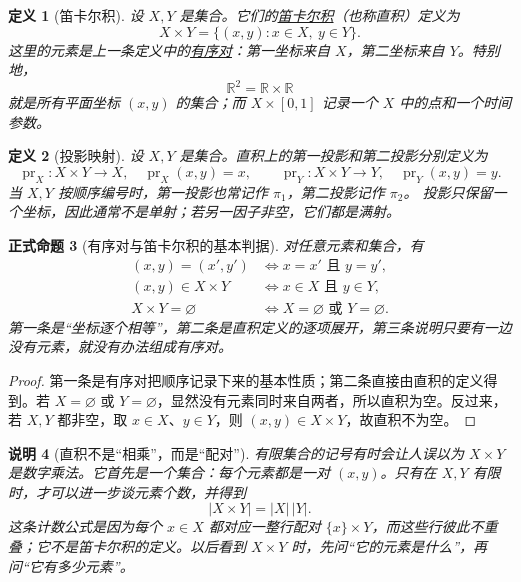 \documentclass[UTF8,fontset=none,a4paper,11pt]{ctexart}
\theoremstyle{foundation-definition}
\newtheorem{definition}{定义}[section]
\theoremstyle{foundation-theorem}
\theoremstyle{foundation-proposition}
\newtheorem{proposition}[definition]{正式命题}
\theoremstyle{foundation-example}
\theoremstyle{foundation-remark}
\newtheorem{remark}[definition]{说明}
\theoremstyle{foundation-theorem}
\newcommand{\term}[2]{\hyperref[#1]{#2}}
\begin{document}
\begin{definition}[笛卡尔积]\label{def:cartesian-product}
设 \(X,Y\) 是集合。它们的\term{def:cartesian-product}{笛卡尔积}（也称直积）定义为
\[
X\times Y=\{(x,y):x\in X,\ y\in Y\}.
\]
这里的元素是上一条定义中的\term{def:ordered-pair}{有序对}：第一坐标来自 \(X\)，第二坐标来自
\(Y\)。特别地，
\[
\mathbb R^2=\mathbb R\times\mathbb R
\]
就是所有平面坐标 \((x,y)\) 的集合；而 \(X\times[0,1]\) 记录一个
\(X\) 中的点和一个时间参数。
\end{definition}

\begin{definition}[投影映射]\label{def:projection-map}
设 \(X,Y\) 是集合。直积上的第一投影和第二投影分别定义为
\[
\operatorname{pr}_X:X\times Y\to X,\quad \operatorname{pr}_X(x,y)=x,
\qquad
\operatorname{pr}_Y:X\times Y\to Y,\quad \operatorname{pr}_Y(x,y)=y.
\]
当 \(X,Y\) 按顺序编号时，第一投影也常记作 \(\pi_1\)，第二投影记作 \(\pi_2\)。
投影只保留一个坐标，因此通常不是单射；若另一因子非空，它们都是满射。
\end{definition}

\begin{proposition}[有序对与笛卡尔积的基本判据]
对任意元素和集合，有
\[
\begin{aligned}
 (x,y)=(x',y')&\Longleftrightarrow x=x'\text{ 且 }y=y',\\
 (x,y)\in X\times Y&\Longleftrightarrow x\in X\text{ 且 }y\in Y,\\
 X\times Y=\varnothing&\Longleftrightarrow X=\varnothing\text{ 或 }Y=\varnothing.
\end{aligned}
\]
第一条是“坐标逐个相等”，第二条是直积定义的逐项展开，第三条说明只要有一边没有元素，就没有办法组成有序对。
\end{proposition}

\begin{proof}
第一条是有序对把顺序记录下来的基本性质；第二条直接由直积的定义得到。若 \(X=\varnothing\) 或 \(Y=\varnothing\)，显然没有元素同时来自两者，所以直积为空。反过来，若 \(X,Y\) 都非空，取 \(x\in X\)、\(y\in Y\)，则 \((x,y)\in X\times Y\)，故直积不为空。
\end{proof}

\begin{remark}[直积不是“相乘”，而是“配对”]
有限集合的记号有时会让人误以为 \(X\times Y\) 是数字乘法。它首先是一个集合：每个元素都是一对 \((x,y)\)。只有在 \(X,Y\) 有限时，才可以进一步谈元素个数，并得到
\[
|X\times Y|=|X|\,|Y|.
\]
这条计数公式是因为每个 \(x\in X\) 都对应一整行配对
\(\{x\}\times Y\)，而这些行彼此不重叠；它不是笛卡尔积的定义。以后看到 \(X\times Y\) 时，先问“它的元素是什么”，再问“它有多少元素”。
\end{remark}
\end{document}
